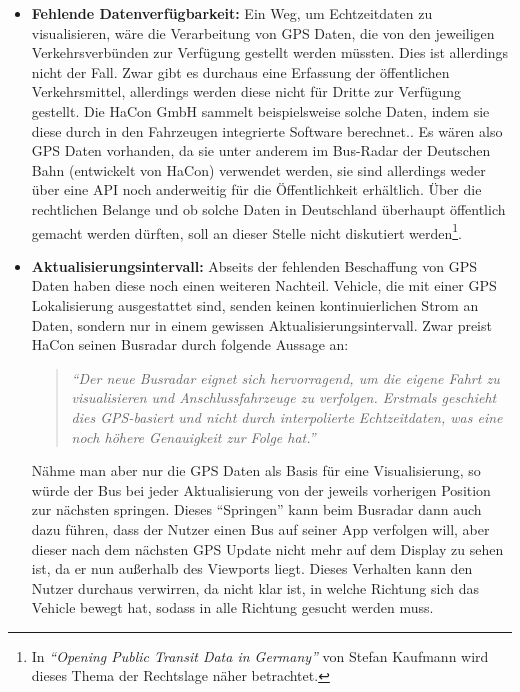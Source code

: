     \begin{itemize}[label={}]
      \item \textbf{Fehlende Datenverfügbarkeit:}
        Ein Weg, um Echtzeitdaten zu visualisieren, wäre die Verarbeitung von GPS Daten, die von den jeweiligen Verkehrsverbünden zur Verfügung gestellt werden müssten. Dies ist allerdings nicht der Fall. Zwar gibt es durchaus eine Erfassung der öffentlichen Verkehrsmittel, allerdings werden diese nicht für Dritte zur Verfügung gestellt. Die HaCon GmbH sammelt beispielsweise solche Daten, indem sie diese durch in den Fahrzeugen integrierte Software berechnet.\parencite{havasBusradar}. Es wären also GPS Daten vorhanden, da sie unter anderem im Bus-Radar der Deutschen Bahn (entwickelt von HaCon) verwendet werden, sie sind allerdings weder über eine API noch anderweitig für die Öffentlichkeit erhältlich. Über die rechtlichen Belange und ob solche Daten in Deutschland überhaupt öffentlich gemacht werden dürften, soll an dieser Stelle nicht diskutiert werden\footnote{In \textit{"`Opening Public Transit Data in Germany"'} von Stefan Kaufmann\parencite{kaufmann} wird dieses Thema der Rechtslage näher betrachtet.}.

      \item \textbf{Aktualisierungsintervall:}
        Abseits der fehlenden Beschaffung von GPS Daten haben diese noch einen weiteren Nachteil. Vehicle, die mit einer GPS Lokalisierung ausgestattet sind, senden keinen kontinuierlichen Strom an Daten, sondern nur in einem gewissen Aktualisierungsintervall. Zwar preist HaCon seinen Busradar durch folgende Aussage an: 

        \begin{quote}
          \textit{"`Der neue Busradar eignet sich hervorragend, um die eigene Fahrt zu visualisieren und Anschlussfahrzeuge zu verfolgen. Erstmals geschieht dies GPS-basiert und nicht durch interpolierte Echtzeitdaten, was eine noch höhere Genauigkeit zur Folge hat."'}\parencite{havasBusradar}
        \end{quote}

        Nähme man aber nur die GPS Daten als Basis für eine Visualisierung, so würde der Bus bei jeder Aktualisierung von der jeweils vorherigen Position zur nächsten springen. Dieses "`Springen"' kann beim Busradar dann auch dazu führen, dass der Nutzer einen Bus auf seiner App verfolgen will, aber dieser nach dem nächsten GPS Update nicht mehr auf dem Display zu sehen ist, da er nun außerhalb des Viewports liegt. Dieses Verhalten kann den Nutzer durchaus verwirren, da nicht klar ist, in welche Richtung sich das Vehicle bewegt hat, sodass in alle Richtung gesucht werden muss.


\end{itemize}
